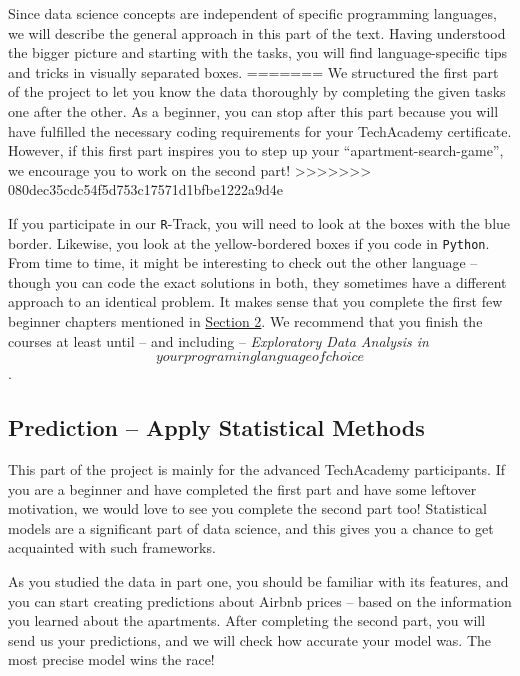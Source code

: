 \documentclass[
  11pt,
]{article}
\begin{document}
Since data science concepts are independent of specific programming languages, we will describe the general approach in this part of the text.
Having understood the bigger picture and starting with the tasks, you will find language-specific tips and tricks in visually separated boxes.
=======
We structured the first part of the project to let you know the data thoroughly by completing the given tasks one after the other. As a beginner, you can stop after this part because you will have fulfilled the necessary coding requirements for your TechAcademy certificate. However, if this first part inspires you to step up your ``apartment-search-game'', we encourage you to work on the second part!
>>>>>>> 080dec35cdc54f5d753c17571d1bfbe1222a9d4e

If you participate in our \texttt{R}-Track, you will need to look at the boxes with the blue border.
Likewise, you look at the yellow-bordered boxes if you code in \texttt{Python}.
From time to time, it might be interesting to check out the other language -- though you can code the exact solutions in both, they sometimes have a different approach to an identical problem.
It makes sense that you complete the first few beginner chapters mentioned in \href{https://tech-academy-ev.github.io/whats-data-science-and-how-do-i-do-it.html\#whats-data-science-and-how-do-i-do-it}{Section 2}.
We recommend that you finish the courses at least until -- and including -- \emph{Exploratory Data Analysis in \[your programing language of choice\]}.

\hypertarget{prediction-apply-statistical-methods}{%
\subsection{Prediction -- Apply Statistical Methods}\label{prediction-apply-statistical-methods}}

This part of the project is mainly for the advanced TechAcademy participants.
If you are a beginner and have completed the first part and have some leftover motivation, we would love to see you complete the second part too!
Statistical models are a significant part of data science, and this gives you a chance to get acquainted with such frameworks.

As you studied the data in part one, you should be familiar with its features, and you can start creating predictions about Airbnb prices -- based on the information you learned about the apartments.
After completing the second part, you will send us your predictions, and we will check how accurate your model was.
The most precise model wins the race!
\end{document}
